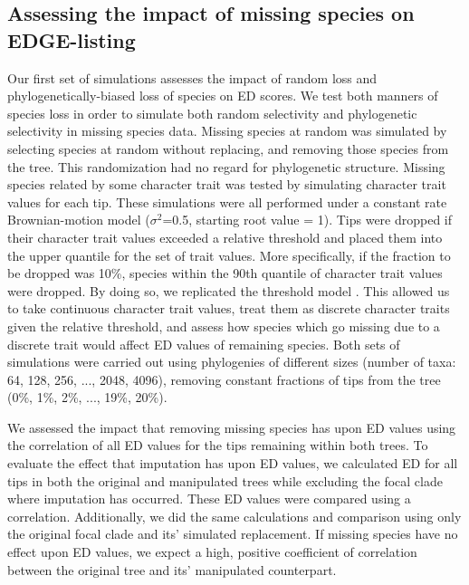 \documentclass[12pt,english]{article}
\begin{document}
\subsection*{Assessing the impact of missing species on EDGE-listing}
Our first set of simulations assesses the impact of random loss and
phylogenetically-biased loss of species on ED scores. We test both manners of
species loss in order to simulate both random selectivity and phylogenetic
selectivity in missing species data. Missing species at random was simulated by
selecting species at random without replacing, and removing those species from
the tree. This randomization had no regard for phylogenetic structure. Missing
species related by some character trait was tested by simulating character trait
values for each tip. These simulations were all performed under a constant rate
Brownian-motion model ($\sigma^2$=0.5, starting root value = 1). Tips were
dropped if their character trait values exceeded a relative threshold and placed
them into the upper quantile for the set of trait values. More specifically, if
the fraction to be dropped was 10\%, species within the 90th quantile of
character trait values were dropped. By doing so, we replicated the threshold
model \autocite{Felsenstein2005}. This allowed us to take continuous character
trait values, treat them as discrete character traits given the relative
threshold, and assess how species which go missing due to a discrete trait would
affect ED values of remaining species. Both sets of simulations were carried out
using phylogenies of different sizes (number of taxa: 64, 128, 256, ..., 2048,
4096), removing constant fractions of tips from the tree (0\%, 1\%, 2\%, ...,
19\%, 20\%).

We assessed the impact that removing missing species has upon ED values using
the correlation of all ED values for the tips remaining within both trees. To
evaluate the effect that imputation has upon ED values, we calculated ED for all
tips in both the original and manipulated trees while excluding the focal clade
where imputation has occurred. These ED values were compared using a
correlation. Additionally, we did the same calculations and comparison using
only the original focal clade and its' simulated replacement. If missing species
have no effect upon ED values, we expect a high, positive coefficient of
correlation between the original tree and its' manipulated counterpart. 

\end{document}
